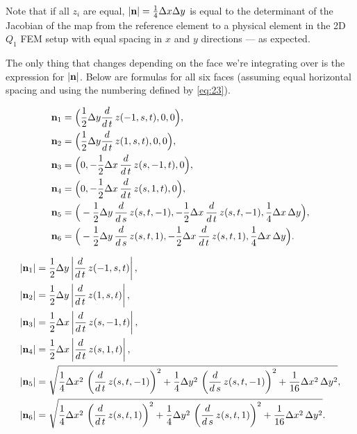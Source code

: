 \documentclass[11pt]{article}
\begin{document}
Note that if all $z_{i}$ are equal, $|\mathbf{n}| = \frac{1}{4} \Delta x \Delta y$ is
equal to the determinant of the Jacobian of the map from the reference
element to a physical element in the 2D $Q_{1}$ FEM setup with equal
spacing in $x$ and $y$ directions --- as expected.

The only thing that changes depending on the face we're integrating
over is the expression for $|\mathbf{n}|$. Below are formulas for all six
faces (assuming equal horizontal spacing and using the numbering
defined by \eqref{eq:23}).

\newcommand{\ddt}{\frac{d}{d\,t}}
\newcommand{\dds}{\frac{d}{d\,s}}
\begin{align*}
  \N_{1} &= \Big(\frac{1}{2}\dy\ddt\, z(-1, s, t), 0, 0  \Big), \\
  \N_{2} &= \Big(\frac{1}{2}\dy\ddt\, z(1, s, t), 0, 0  \Big), \\
  \N_{3} &= \Big(0, -\frac{1}{2}\dx\, \ddt\, z(s, -1, t), 0  \Big), \\
  \N_{4} &= \Big(0, -\frac{1}{2}\dx\, \ddt\, z(s, 1, t), 0  \Big), \\
  \N_{5} &= \Big(-\frac{1}{2}\dy\, \dds\, z(s, t, -1), -\frac{1}{2}\dx\, \ddt\, z(s, t, -1), \frac{1}{4}\dx\, \dy  \Big), \\
  \N_{6} &= \Big(-\frac{1}{2}\dy\, \dds\, z(s, t, 1), -\frac{1}{2}\dx\, \ddt\, z(s, t, 1), \frac{1}{4}\dx\, \dy  \Big) . \\
\end{align*}

\begin{align*}
  \left| \N_{1}\right|  & = \frac{1}{2}\dy\left| \ddt\,z(-1 , s , t)\right|, \\
  \left| \N_{2}\right|  & = \frac{1}{2}\dy\left| \ddt\,z(1 , s , t)\right|, \\
  \left| \N_{3}\right|  & = \frac{1}{2}\dx\left| \ddt\,z(s , -1 , t)\right|,\\
  \left| \N_{4}\right|  & = \frac{1}{2}\dx\left| \ddt\,z(s , 1 , t)\right|, \\
  \left| \N_{5}\right|  & = \sqrt{\frac{1}{4}\dx^2\,\left(\ddt\,z(s , t , -1)\right)^2+\frac{1}{4}\dy^2\,\left(\dds\,z(s , t , -1)\right)^2+\frac{1}{16}\dx^2\,\dy^2}, \\
  \left| \N_{6}\right|  & = \sqrt{\frac{1}{4}\dx^2\,\left(\ddt\,z(s , t , 1)\right)^2 +\frac{1}{4}\dy^2\,\left(\dds\,z(s , t , 1)\right)^2 +\frac{1}{16}\dx^2\,\dy^2}. \\
\end{align*}



\end{document}

